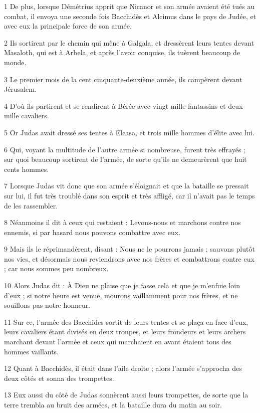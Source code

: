 \par 1 De plus, lorsque Démétrius apprit que Nicanor et son armée avaient été tués au combat, il envoya une seconde fois Bacchidès et Alcimus dans le pays de Judée, et avec eux la principale force de son armée.
\par 2 Ils sortirent par le chemin qui mène à Galgala, et dressèrent leurs tentes devant Masaloth, qui est à Arbela, et après l'avoir conquise, ils tuèrent beaucoup de monde.
\par 3 Le premier mois de la cent cinquante-deuxième année, ils campèrent devant Jérusalem.
\par 4 D'où ils partirent et se rendirent à Bérée avec vingt mille fantassins et deux mille cavaliers.
\par 5 Or Judas avait dressé ses tentes à Eleasa, et trois mille hommes d'élite avec lui.
\par 6 Qui, voyant la multitude de l'autre armée si nombreuse, furent très effrayés ; sur quoi beaucoup sortirent de l'armée, de sorte qu'ils ne demeurèrent que huit cents hommes.
\par 7 Lorsque Judas vit donc que son armée s'éloignait et que la bataille se pressait sur lui, il fut très troublé dans son esprit et très affligé, car il n'avait pas le temps de les rassembler.
\par 8 Néanmoins il dit à ceux qui restaient : Levons-nous et marchons contre nos ennemis, si par hasard nous pouvons combattre avec eux.
\par 9 Mais ils le réprimandèrent, disant : Nous ne le pourrons jamais ; sauvons plutôt nos vies, et désormais nous reviendrons avec nos frères et combattrons contre eux ; car nous sommes peu nombreux.
\par 10 Alors Judas dit : À Dieu ne plaise que je fasse cela et que je m'enfuie loin d'eux ; si notre heure est venue, mourons vaillamment pour nos frères, et ne souillons pas notre honneur.
\par 11 Sur ce, l'armée des Bacchides sortit de leurs tentes et se plaça en face d'eux, leurs cavaliers étant divisés en deux troupes, et leurs frondeurs et leurs archers marchant devant l'armée et ceux qui marchaient en avant étaient tous des hommes vaillants.
\par 12 Quant à Bacchidès, il était dans l'aile droite ; alors l'armée s'approcha des deux côtés et sonna des trompettes.
\par 13 Eux aussi du côté de Judas sonnèrent aussi leurs trompettes, de sorte que la terre trembla au bruit des armées, et la bataille dura du matin au soir.
